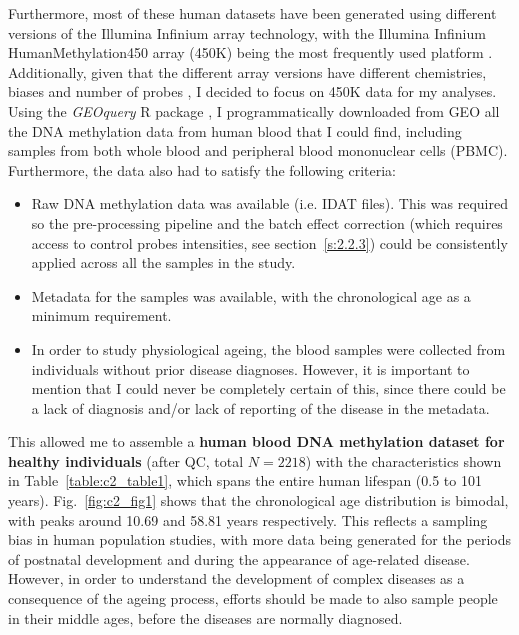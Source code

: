 Furthermore, most of these human datasets have been generated using different versions of the Illumina Infinium array technology, with the Illumina Infinium HumanMethylation450 array (450K) being the most frequently used platform \cite{Flanagan2015}. Additionally, given that the different array versions have different chemistries, biases and number of probes \cite{Bibikova2009,Bibikova2011,Pidsley2016}, I decided to focus on 450K data for my analyses. Using the \textit{GEOquery} R package \cite{Davis2007}, I programmatically downloaded from GEO all the DNA methylation data from human blood that I could find, including samples from both whole blood and peripheral blood mononuclear cells (\acrshort{PBMC}). Furthermore, the data also had to satisfy the following criteria:

\begin{itemize}
	
	\item Raw DNA methylation data was available (i.e. IDAT files). This was required so the pre-processing pipeline and the batch effect correction (which requires access to control probes intensities, see section~\ref{s:2.2.3}) could be consistently applied across all the samples in the study.
	
	\item Metadata for the samples was available, with the chronological age as a minimum requirement. 
	
	\item In order to study physiological ageing, the blood samples were collected from individuals without prior disease diagnoses. However, it is important to mention that I could never be completely certain of this, since there could be a lack of diagnosis and/or lack of reporting of the disease in the metadata. 
	
\end{itemize}

\smallskip

This allowed me to assemble a \textbf{human blood DNA methylation dataset for healthy individuals} (after \acrshort{QC}, total $N=2218$) with the characteristics shown in Table~\ref{table:c2_table1}, which spans the entire human lifespan (0.5 to 101 years). Fig.~\ref{fig:c2_fig1} shows that the chronological age distribution is bimodal, with peaks around 10.69 and 58.81 years respectively. This reflects a sampling bias in human population studies, with more data being generated for the periods of postnatal development and during the appearance of age-related disease. However, in order to understand the development of complex diseases as a consequence of the ageing process, efforts should be made to also sample people in their middle ages, before the diseases are normally diagnosed.   



